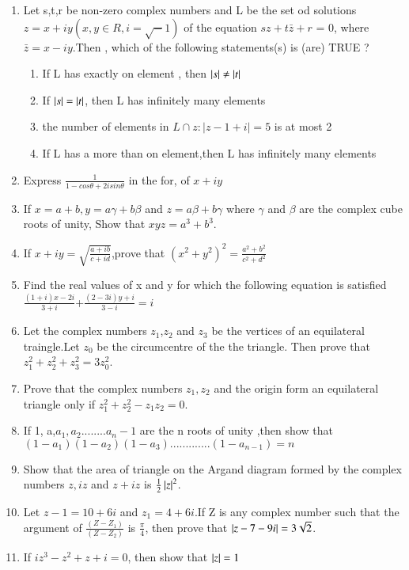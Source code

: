 \begin{enumerate}[label=\arabic*.,ref=\thesubsection.\theenumi]
\begin{enumerate}
    \end{enumerate}
    \item Let s,t,r be non-zero complex numbers and L be the set od solutions $z = x+iy(x,y \in R,
    i = \sqrt -1)$ of the equation $sz+t\bar z+r$ = 0, where $\bar z = x-iy$.Then , which of the following statements(s) is (are) TRUE ?
    \begin{enumerate}
    \item   If L has exactly on element , then $\left\vert s\right\vert \neq \left\vert t\right\vert $
    \item   If $\left\vert s\right\vert = \left\vert t\right\vert $, then L has infinitely many elements 
    \item   the number of elements in $L\cap { z :\vert z-1+i\vert =5}$ is at most 2
    \item   If L has a more than on element,then L has infinitely many elements
    \end{enumerate}
    \item Express $\frac{1}{1-cos\theta+2isin\theta}$ in the for, of $x+iy$
    \item If $x = a+b,y = a\gamma+b\beta$ and $z = a\beta+b\gamma$ where $\gamma$ and $\beta$ are the complex cube roots of unity, Show that $xyz=a^3+b^3$.
    \item If $x+iy = \sqrt{\frac{a+ib}{c+id}}$,prove that $(x^2+y^2)^2 = \frac{a^2+b^2}{c^2+d^2}$
    \item Find the real values of x and y for which the following equation is satisfied $\frac{(1+i)x-2i}{3+i}$+$\frac{(2-3i)y+i}{3-i} = i$
    \item Let the complex numbers $z_1$,$z_2$ and $z_3$ be the vertices of an equilateral traingle.Let $z_0$ be the circumcentre of the the triangle. Then prove that $z_1^2+z_2^2+z_3^2 = 3z_0^2$.
    \item Prove that the complex numbers $z_1,z_2$ and the origin form an equilateral triangle only if
    $z_1^2+z_2^2-z_1z_2 = 0$.
    \item If 1, a,$a_1,a_2........a_n-1$ are the n roots of unity ,then show that $(1-a_1)(1-a_2)(1-a_3).............(1-a_{n-1}) = n$
    \item Show that the area of triangle on the Argand diagram formed by the complex numbers $z, iz$ and $z+iz$ is $\frac{1}{2}\left\vert z\right\vert^2$.
    \item Let $z-1 = 10+6i$ and $z_1 = 4+6i$.If Z is any complex number
    such that the argument of $\frac{(Z-Z_1)}{(Z-Z_2)}$ is $\frac{\pi}{4}$, then prove that $\left\vert z-7-9i\right\vert =3\sqrt 2$.
    \item  If $iz^3-z^2+z+i = 0$, then show that  $\left\vert z\right\vert = 1$

\end{enumerate}
